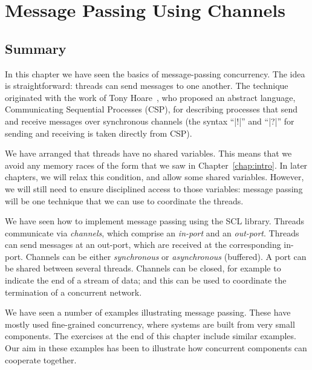 \chapter{Message Passing Using Channels} 
\label{chap:channels}



\section{Summary}

In this chapter we have seen the basics of message-passing concurrency.  The
idea is straightforward: threads can send messages to one another.  The
technique originated with the work of Tony Hoare~\cite{Hoare78}, who proposed
an abstract language, Communicating Sequential Processes (CSP), for
describing processes that send and receive messages over synchronous channels
(the syntax ``|!|'' and ``|?|'' for sending and receiving is taken directly
from CSP).

We have arranged that threads have no shared variables.  This means that we
avoid any memory races of the form that we saw in Chapter~\ref{chap:intro}.
In later chapters, we will relax this condition, and allow some shared
variables.  However, we will still need to ensure disciplined access to those
variables: message passing will be one technique that we can use to
coordinate the threads.  

We have seen how to implement message passing using the SCL library.  Threads
communicate via \emph{channels}, which comprise an \emph{in-port} and an
\emph{out-port}.  Threads can send messages at an out-port, which are received
at the corresponding in-port.  Channels can be either \emph{synchronous} or
\emph{asynchronous} (buffered).  A port can be shared between several threads.
Channels can be closed, for example to indicate the end of a stream of data;
and this can be used to coordinate the termination of a concurrent network.

We have seen a number of examples illustrating message passing.  These have
mostly used fine-grained concurrency, where systems are built from very small
components.  The exercises at the end of this chapter include similar
examples.  Our aim in these examples has been to illustrate how concurrent
components can cooperate together.

